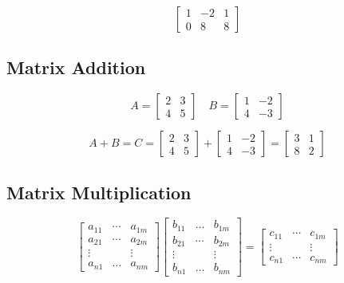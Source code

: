 \documentclass[main.tex]{subfiles}
\begin{document}
    $$
    \left[\begin{array}{cc|c}
    1 & -2 & 1 \\
    0 & 8 & 8
    \end{array}\right]
    $$
    
\subsection{Matrix Addition}

    $$
    A=\left[\begin{array}{ll}
    2 & 3 \\
    4 & 5
    \end{array}\right] \quad B=\left[\begin{array}{ll}
    1 & -2 \\
    4 & -3
    \end{array}\right]
    $$
    
    $$
    A+B=C=\left[\begin{array}{ll}
    2 & 3 \\
    4 & 5
    \end{array}\right]+\left[\begin{array}{ll}
    1 & -2 \\
    4 & -3
    \end{array}\right]=\left[\begin{array}{ll}
    3 & 1 \\
    8 & 2
    \end{array}\right]
    $$

\subsection{Matrix Multiplication}

    $$
    \left[\begin{array}{ccc}
    a_{11} & \cdots & a_{1 m} \\
    a_{21} & \cdots & a_{2 m} \\
    \vdots & &  \vdots \\
    a_{n 1} & \ldots & a_{n m}
    \end{array}\right]
    \left[\begin{array}{ccc}
    b_{11} & \ldots & b_{1 m} \\
    b_{21} & \cdots & b_{2 m} \\
    \vdots & &  \vdots \\
    b_{n 1} & \ldots & b_{n m}
    \end{array}\right]
    =\left[\begin{array}{ccc}
    c_{11} & \cdots & c_{1 m} \\
    \vdots & & \vdots \\
    c_{n 1} & \cdots & c_{n m}
    \end{array}\right]
    $$
    
\end{document}
